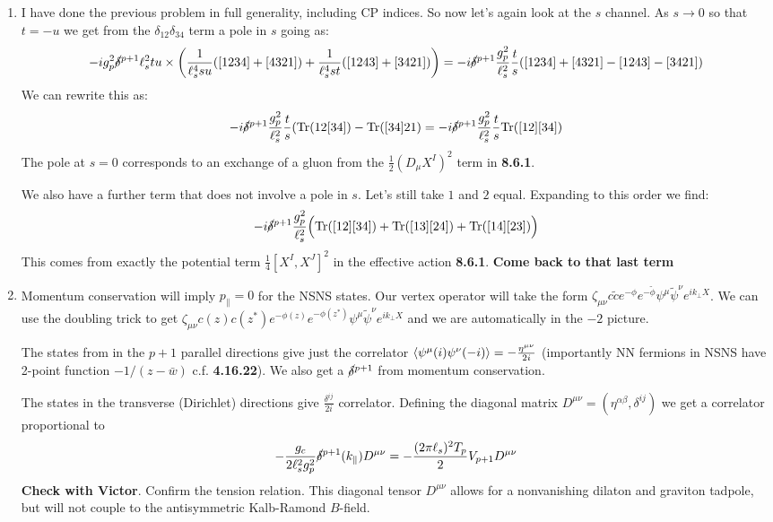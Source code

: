 \documentclass[11pt, class=article, crop=false]{standalone}
\begin{document}
\begin{enumerate}
	
	\item I have done the previous problem in full generality, including CP indices. So now let's again look at the $s$ channel. As $s \to 0$ so that $t = -u$ we get from the $\delta_{12} \delta_{34}$ term a pole in $s$ going as:
	\[
		- i g_p^2 \cancel\delta^{p+1} \ell_s^2 tu \times \left(\frac{1}{\ell_s^4 su} ([1234] + [4321]) + \frac{1}{\ell_s^4 st} ([1243] + [3421])\right) = -i \cancel\delta^{p+1} \frac{g_p^2}{\ell_s^2} \frac{t}{s} ([1234] + [4321] - [1243] - [3421])
	\]
	We can rewrite this as:
	\[
		-i \cancel\delta^{p+1} \frac{g_p^2}{\ell_s^2} \frac{t}{s} (\mathrm{Tr}(12[34]) - \mathrm{Tr}([34]21) = -i \cancel\delta^{p+1} \frac{g_p^2}{\ell_s^2} \frac{t}{s} \mathrm{Tr} ([12] [34])
	\]
	The pole at $s = 0$ corresponds to an exchange of a gluon from the $\frac12 (D_\mu X^I)^2$ term in \textbf{8.6.1}.
	
	We also have a further term that does not involve a pole in $s$. Let's still take $1$ and $2$ equal. Expanding to this order we find:
	\[
		-i \cancel\delta^{p+1} \frac{g_p^2}{\ell_s^2} \Big( \mathrm{Tr}([12][34])  + \mathrm{Tr}([13][24]) + \mathrm{Tr}([14][23]) \Big) 
	\]
	This comes from exactly the potential term $\frac14 [X^I, X^J]^2$ in the effective action \textbf{8.6.1}. \textbf{Come back to that last term}
	
	\item Momentum conservation will imply $p_{\parallel} = 0$ for the NSNS states. Our vertex operator will take the form $\zeta_{\mu \nu} c \tilde c e^{-\phi} e^{- \tilde \phi} \psi^\mu \tilde \psi^\nu e^{i k_{\perp} X}$. We can use the doubling trick to get $\zeta_{\mu \nu} c(z) c(z^*) e^{-\phi(z)} e^{-\phi(z^*)} \psi^\mu \tilde \psi^\nu e^{i k_{\perp} X}$ and we are automatically in the $-2$ picture. 
	
	The states from in the $p+1$ parallel directions give just the correlator $\braket{\psi^\mu(i) \psi^\nu(-i)} = -\frac{\eta^{\mu \nu}}{2i}$ (importantly NN fermions in NSNS have 2-point function $-1/(z-\bar w)$ c.f. \textbf{4.16.22}). We also get a $\cancel\delta^{p+1}$ from momentum conservation.
	
	The states in the transverse (Dirichlet) directions give $\frac{\delta^{ij}}{2i}$ correlator. Defining the diagonal matrix $D^{\mu \nu} = (\eta^{\alpha \beta}, \delta^{ij})$ we get a correlator proportional to 
	\[
		-\frac{g_c}{2 \ell_s^2 g_p^2}\cancel\delta^{p+1}(k_{\parallel})  D^{\mu \nu}  = - \frac{(2 \pi \ell_s)^2 T_p}{2} V_{p+1} D^{\mu \nu}
	\]
	\textbf{Check with Victor}. Confirm the tension relation. This diagonal tensor $D^{\mu \nu}$ allows for a nonvanishing dilaton and graviton tadpole, but will not couple to the antisymmetric Kalb-Ramond $B$-field. 
	

\end{enumerate}
\end{document}
